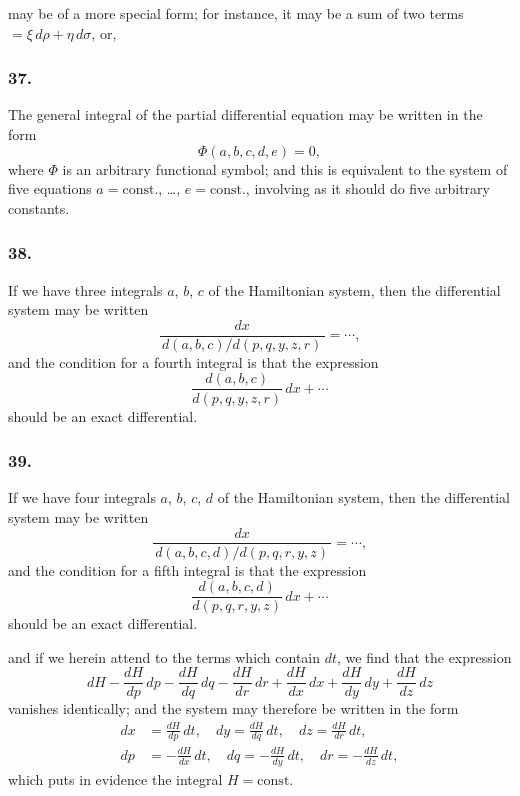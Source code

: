 \documentclass[11pt,a4paper]{book}
\begin{document}
\newpage
\setcounter{page}{127}

may be of a more special form; for instance, it may be a sum of two terms $= \xi\,d\rho + \eta\,d\sigma$, or,

\subsubsection*{37.}

The general integral of the partial differential equation may be written in the form
\[
\Phi(a, b, c, d, e) = 0,
\]
where $\Phi$ is an arbitrary functional symbol; and this is equivalent to the system of five equations $a = \text{const.}$, \ldots, $e = \text{const.}$, involving as it should do five arbitrary constants.

\subsubsection*{38.}

If we have three integrals $a$, $b$, $c$ of the Hamiltonian system, then the differential system may be written
\[
\frac{dx}{\,d(a, b, c)/d(p, q, y, z, r)\,} = \cdots,
\]
and the condition for a fourth integral is that the expression
\[
\frac{d(a, b, c)}{d(p, q, y, z, r)}\,dx + \cdots
\]
should be an exact differential.

\subsubsection*{39.}

If we have four integrals $a$, $b$, $c$, $d$ of the Hamiltonian system, then the differential system may be written
\[
\frac{dx}{\,d(a, b, c, d)/d(p, q, r, y, z)\,} = \cdots,
\]
and the condition for a fifth integral is that the expression
\[
\frac{d(a, b, c, d)}{d(p, q, r, y, z)}\,dx + \cdots
\]
should be an exact differential.

\newpage
\setcounter{page}{128}

and if we herein attend to the terms which contain $dt$, we find that the expression
\[
dH - \frac{dH}{dp}\,dp - \frac{dH}{dq}\,dq - \frac{dH}{dr}\,dr + \frac{dH}{dx}\,dx + \frac{dH}{dy}\,dy + \frac{dH}{dz}\,dz
\]
vanishes identically; and the system may therefore be written in the form
\begin{align*}
dx &= \frac{dH}{dp}\,dt, \quad dy = \frac{dH}{dq}\,dt, \quad dz = \frac{dH}{dr}\,dt, \\
dp &= -\frac{dH}{dx}\,dt, \quad dq = -\frac{dH}{dy}\,dt, \quad dr = -\frac{dH}{dz}\,dt,
\end{align*}
which puts in evidence the integral $H = \text{const.}$
\end{document}
